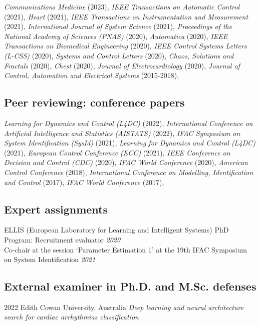 \documentclass[10pt,letterpaper]{article} %
\begin{document}
 {\em Communications Medicine } (2023),  {\em IEEE Transactions on Automatic Control } (2021),  {\em Heart } (2021),  {\em IEEE Transactions on Instrumentation and Measurement } (2021),  {\em International Journal of System Science } (2021),  {\em Proceedings of the National Academy of Sciences (PNAS) } (2020),  {\em Automatica } (2020),  {\em IEEE Transactions on Biomedical Engineering } (2020),  {\em IEEE Control Systems Letters (L-CSS) } (2020),  {\em Systems and Control Letters } (2020),  {\em Chaos, Solutions and Fractals } (2020),  {\em Chest } (2020),  {\em Journal of Electrocardiology } (2020),  {\em Journal of Control, Automation and Electrical Systems } (2015-2018), 

\subsection*{Peer reviewing: conference papers}

 {\em Learning for Dynamics and Control (L4DC) } (2022),  {\em International Conference on Artificial Intelligence and Statistics (AISTATS) } (2022),  {\em IFAC Symposium on System Identification (SysId) } (2021),  {\em Learning for Dynamics and Control (L4DC) } (2021),  {\em European Control Conference (ECC) } (2021),  {\em IEEE Conference on Decision and Control (CDC) } (2020),  {\em IFAC World Conference } (2020),  {\em American Control Conference } (2018),  {\em International Conference on Modelling, Identification and Control } (2017),  {\em IFAC World Conference } (2017), 

\subsection*{Expert assignments}

 ELLIS (European Laboratory for Learning and Intelligent Systems) PhD Program: Recruitment evaluator \hfill {\em 2020 } \\  Co-chair at the session `Parameter Estimation 1' at the 19th IFAC Symposium on System Identification \hfill {\em 2021 } \\ 

\subsection*{External examiner in Ph.D. and M.Sc. defenses}


    { 2022 }
    {  }
    { Edith Cowan University, Australia }
    { {\it Deep learning and neural architecture search for cardiac arrhythmias classification } }
\end{document}
